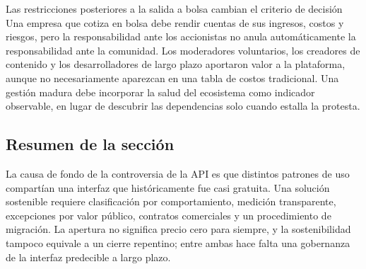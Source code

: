 \begin{warningbox}{Las restricciones posteriores a la salida a bolsa cambian el criterio de decisión}
Una empresa que cotiza en bolsa debe rendir cuentas de sus ingresos, costos y riesgos, pero la responsabilidad ante los accionistas no anula automáticamente la responsabilidad ante la comunidad. Los moderadores voluntarios, los creadores de contenido y los desarrolladores de largo plazo aportaron valor a la plataforma, aunque no necesariamente aparezcan en una tabla de costos tradicional. Una gestión madura debe incorporar la salud del ecosistema como indicador observable, en lugar de descubrir las dependencias solo cuando estalla la protesta.
\end{warningbox}

\subsection{Resumen de la sección}

La causa de fondo de la controversia de la API es que distintos patrones de uso compartían una interfaz que históricamente fue casi gratuita. Una solución sostenible requiere clasificación por comportamiento, medición transparente, excepciones por valor público, contratos comerciales y un procedimiento de migración. La apertura no significa precio cero para siempre, y la sostenibilidad tampoco equivale a un cierre repentino; entre ambas hace falta una gobernanza de la interfaz predecible a largo plazo.
